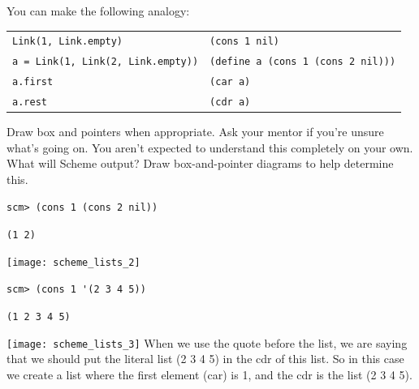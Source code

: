 \begin{nonsol}
You can make the following analogy:
\begin{center}
\begin{tabular}{ |l|l| }
\hline
 \texttt{Link(1, Link.empty)} & \texttt{(cons 1 nil)} \\
 \texttt{a = Link(1, Link(2, Link.empty))} & \texttt{(define a (cons 1 (cons 2 nil)))}  \\
 \texttt{a.first} & \texttt{(car a)} \\
 \texttt{a.rest} & \texttt{(cdr a)} \\
 \hline
\end{tabular}

\end{center}
Draw box and pointers when appropriate. Ask your mentor if you're unsure what's going on. You aren't expected to understand this completely on your own.
\question What will Scheme output? Draw box-and-pointer diagrams to help determine this.
\end{nonsol}

\begin{lstlisting}
scm> (cons 1 (cons 2 nil))
\end{lstlisting}
\begin{solution}[0.25in]
\texttt{(1 2)}
\begin{center}
\texttt{[image: scheme\_lists\_2]}
\end{center}
\end{solution}

\begin{lstlisting}
scm> (cons 1 '(2 3 4 5))
\end{lstlisting}
\begin{solution}[0.25in]
\texttt{(1 2 3 4 5)}
\begin{center}
\texttt{[image: scheme\_lists\_3]}
When we use the quote before the list, we are saying that we should put the literal list (2 3 4 5) in the cdr of this list. So in this case we create a list where the first element (car) is 1, and the cdr is the list (2 3 4 5).
\end{center}
\end{solution}

